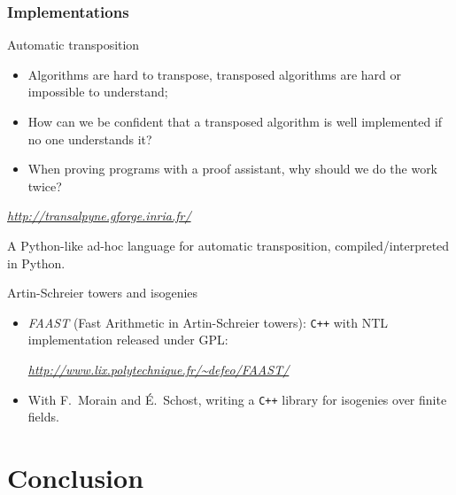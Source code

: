\documentclass[10pt,usepdftitle=false]{beamer}
\begin{document}
\begin{frame}
  \frametitle{Implementations}


  \begin{block}{Automatic transposition}
    \begin{itemize}
    \item Algorithms are hard to transpose, transposed algorithms are
      hard or impossible to understand;
    \item How can we be confident that a transposed algorithm is well
      implemented if no one understands it?
    \item When proving programs with a proof assistant, why should we do
      the work twice?
    \end{itemize}

    \hfill\emph{\url{http://transalpyne.gforge.inria.fr/}}\hfill\strut

    A Python-like ad-hoc language for automatic transposition,
    compiled/interpreted in Python.
  \end{block}
  
  \begin{block}{Artin-Schreier towers and isogenies}
    \begin{itemize}
    \item \emph{FAAST} (Fast Arithmetic in Artin-Schreier towers):
      \texttt{C++} with NTL implementation released under GPL:

      \hfill\emph{\url{http://www.lix.polytechnique.fr/~defeo/FAAST/}}\hfill\strut
    \item With F.~Morain and É.~Schost, writing a \texttt{C++} library
      for isogenies over finite fields.
    \end{itemize}
  \end{block}
\end{frame}


\section{Conclusion}
\end{document}
